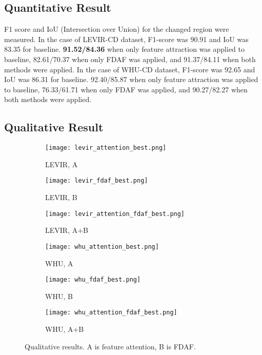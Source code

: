 \documentclass[../main.tex]{subfiles}
\begin{document}
\subsection{Quantitative Result}
F1 score and IoU (Intersection over Union) for the changed region were measured. In the case of LEVIR-CD dataset, F1-score was 90.91 and IoU was 83.35 for baseline. \textbf{91.52/84.36} when only feature attraction was applied to baseline, 82.61/70.37 when only FDAF was applied, and 91.37/84.11 when both methods were applied. In the case of WHU-CD dataset, F1-score was 92.65 and IoU was 86.31 for baseline.  92.40/85.87 when only feature attraction was applied to baseline, 76.33/61.71 when only FDAF was applied, and 90.27/82.27 when both methods were applied.



\subsection{Qualitative Result}
\begin{figure}[h]
    \centering
    \begin{subfigure}[b]{0.16\linewidth}
        \texttt{[image: levir\_attention\_best.png]}
        \caption{LEVIR, A}
    \end{subfigure}
    \begin{subfigure}[b]{0.16\linewidth}
        \texttt{[image: levir\_fdaf\_best.png]}
        \caption{LEVIR, B}
    \end{subfigure}
    \begin{subfigure}[b]{0.16\linewidth}
        \texttt{[image: levir\_attention\_fdaf\_best.png]}
        \caption{LEVIR, A+B}
    \end{subfigure}
    \begin{subfigure}[b]{0.16\linewidth}
        \texttt{[image: whu\_attention\_best.png]}
        \caption{WHU, A}
    \end{subfigure}
    \begin{subfigure}[b]{0.16\linewidth}
        \texttt{[image: whu\_fdaf\_best.png]}
        \caption{WHU, B}
    \end{subfigure}
    \begin{subfigure}[b]{0.16\linewidth}
        \texttt{[image: whu\_attention\_fdaf\_best.png]}
        \caption{WHU, A+B}
    \end{subfigure}
    \caption{Qualitative results. A is feature attention, B is FDAF.}
    \label{fig:qualitative_results}
\end{figure}
\end{document}
